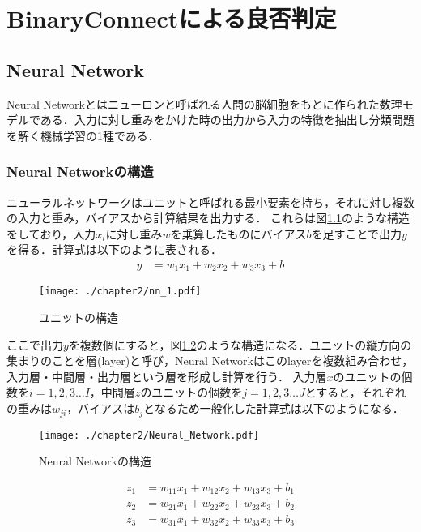 

\chapter{BinaryConnectによる良否判定}

\section{Neural Network}
Neural Networkとはニューロンと呼ばれる人間の脳細胞をもとに作られた数理モデルである．入力に対し重みをかけた時の出力から入力の特徴を抽出し分類問題を解く機械学習の1種である．

\subsection{Neural Networkの構造}
ニューラルネットワークはユニットと呼ばれる最小要素を持ち，それに対し複数の入力と重み，バイアスから計算結果を出力する．
これらは図\ref{fig_NN1}のような構造をしており，入力$x_i$に対し重み$w$を乗算したものにバイアス$b$を足すことで出力$y$を得る．計算式は以下のように表される．
\begin{align*}
y &= w_{1}x_{1} + w_{2}x_{2} + w_{3}x_{3} + b
\end{align*}
\begin{figure}[]
  \begin{center}
    \texttt{[image: ./chapter2/nn\_1.pdf]}
    \caption{ユニットの構造}
    \label{fig_NN1}
  \end{center}
\end{figure}

ここで出力$y$を複数個にすると，図\ref{fig_NN}のような構造になる．ユニットの縦方向の集まりのことを層(layer)と呼び，Neural Networkはこのlayerを複数組み合わせ，入力層・中間層・出力層という層を形成し計算を行う．
入力層$x$のユニットの個数を$i=1,2,3\ldots I$，中間層$z$のユニットの個数を$j=1,2,3\ldots J$とすると，それぞれの重みは$w_{ji}$，バイアスは$b_j$となるため一般化した計算式は以下のようになる．
\begin{figure}[]
  \begin{center}
    \texttt{[image: ./chapter2/Neural\_Network.pdf]}
    \caption{Neural Networkの構造}
    \label{fig_NN}
  \end{center}
\end{figure}
\begin{align*}
z_{1} &= w_{11}x_{1} + w_{12}x_{2} + w_{13}x_{3} + b_1\\
z_{2} &= w_{21}x_{1} + w_{22}x_{2} + w_{23}x_{3} + b_2\\
z_{3} &= w_{31}x_{1} + w_{32}x_{2} + w_{33}x_{3} + b_3
\end{align*}

